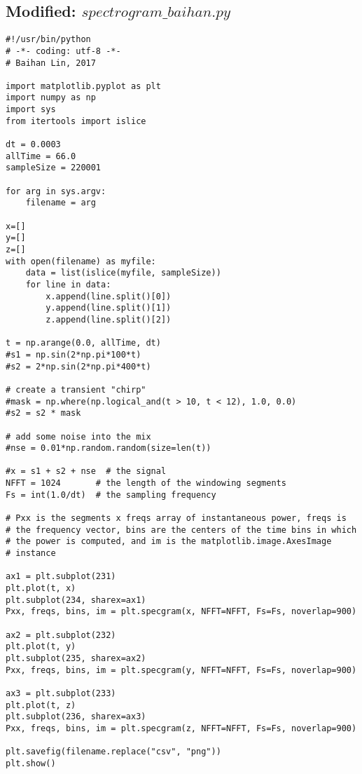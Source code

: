 \documentclass{sigchi}
\begin{document}
\subsection{Modified: $spectrogram\_baihan.py$}\label{ss:specPy}
\begin{lstlisting}
#!/usr/bin/python
# -*- coding: utf-8 -*-
# Baihan Lin, 2017

import matplotlib.pyplot as plt
import numpy as np
import sys
from itertools import islice

dt = 0.0003
allTime = 66.0
sampleSize = 220001

for arg in sys.argv:
	filename = arg

x=[]
y=[]
z=[]
with open(filename) as myfile:
    data = list(islice(myfile, sampleSize))
    for line in data:
        x.append(line.split()[0])
        y.append(line.split()[1])
        z.append(line.split()[2])

t = np.arange(0.0, allTime, dt)
#s1 = np.sin(2*np.pi*100*t)
#s2 = 2*np.sin(2*np.pi*400*t)

# create a transient "chirp"
#mask = np.where(np.logical_and(t > 10, t < 12), 1.0, 0.0)
#s2 = s2 * mask

# add some noise into the mix
#nse = 0.01*np.random.random(size=len(t))

#x = s1 + s2 + nse  # the signal
NFFT = 1024       # the length of the windowing segments
Fs = int(1.0/dt)  # the sampling frequency

# Pxx is the segments x freqs array of instantaneous power, freqs is
# the frequency vector, bins are the centers of the time bins in which
# the power is computed, and im is the matplotlib.image.AxesImage
# instance

ax1 = plt.subplot(231)
plt.plot(t, x)
plt.subplot(234, sharex=ax1)
Pxx, freqs, bins, im = plt.specgram(x, NFFT=NFFT, Fs=Fs, noverlap=900)

ax2 = plt.subplot(232)
plt.plot(t, y)
plt.subplot(235, sharex=ax2)
Pxx, freqs, bins, im = plt.specgram(y, NFFT=NFFT, Fs=Fs, noverlap=900)

ax3 = plt.subplot(233)
plt.plot(t, z)
plt.subplot(236, sharex=ax3)
Pxx, freqs, bins, im = plt.specgram(z, NFFT=NFFT, Fs=Fs, noverlap=900)

plt.savefig(filename.replace("csv", "png"))
plt.show()
\end{lstlisting}
\end{document}
